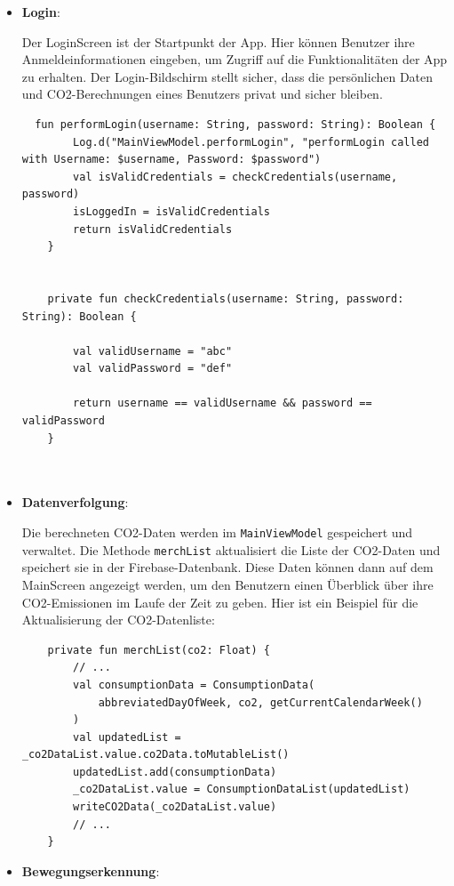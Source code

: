 \documentclass{article}
\begin{document}
\begin{itemize}
    
            \item \textbf{Login}:
            
             Der LoginScreen ist der Startpunkt der App. Hier können Benutzer ihre Anmeldeinformationen eingeben, um Zugriff auf die Funktionalitäten der App zu erhalten. Der Login-Bildschirm stellt sicher, dass die persönlichen Daten und CO2-Berechnungen eines Benutzers privat und sicher bleiben.

    
    \begin{lstlisting}
  fun performLogin(username: String, password: String): Boolean {
        Log.d("MainViewModel.performLogin", "performLogin called with Username: $username, Password: $password")
        val isValidCredentials = checkCredentials(username, password)
        isLoggedIn = isValidCredentials
        return isValidCredentials
    }


    private fun checkCredentials(username: String, password: String): Boolean {

        val validUsername = "abc"
        val validPassword = "def"

        return username == validUsername && password == validPassword
    }
   
   
    \end{lstlisting}
    
    
    
        \item \textbf{Datenverfolgung}:
        
    Die berechneten CO2-Daten werden im \texttt{MainViewModel} gespeichert und verwaltet. Die Methode \texttt{merchList} aktualisiert die Liste der CO2-Daten und speichert sie in der Firebase-Datenbank. Diese Daten können dann auf dem MainScreen angezeigt werden, um den Benutzern einen Überblick über ihre CO2-Emissionen im Laufe der Zeit zu geben. Hier ist ein Beispiel für die Aktualisierung der CO2-Datenliste:
    
    \begin{lstlisting}
    private fun merchList(co2: Float) {
        // ...
        val consumptionData = ConsumptionData(
            abbreviatedDayOfWeek, co2, getCurrentCalendarWeek()
        )
        val updatedList = _co2DataList.value.co2Data.toMutableList()
        updatedList.add(consumptionData)
        _co2DataList.value = ConsumptionDataList(updatedList)
        writeCO2Data(_co2DataList.value)
        // ...
    }
    \end{lstlisting}

    \item \textbf{Bewegungserkennung}:
    

\end{itemize}
\end{document}
